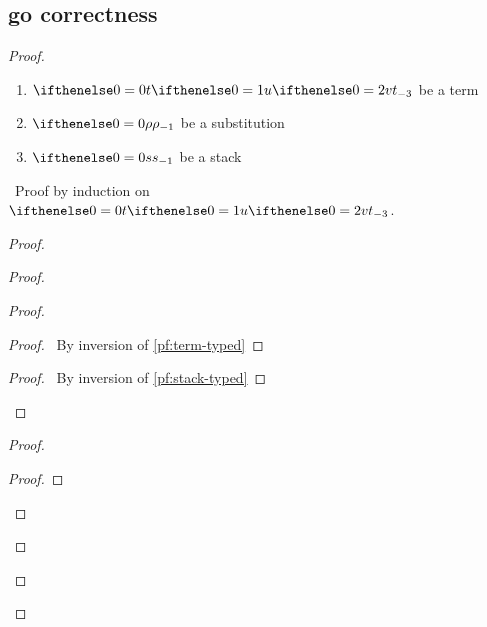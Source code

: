 \documentclass[a4paper]{article}
\begin{document}
\subsection{{\sf go} correctness}
\begin{proof}
  \pflet 
  {\begin{enumerate}
    \item $\aTerm$ be a term
    \item $\env$ be a substitution
    \item $\aStack$ be a stack
  \end{enumerate}}
  \prove{$\simplBeta[*] {\stackapp \aStack {\subs \aTerm \env}} {\betaNormal {\go {\scoped \aTerm \env} \aStack}}$}
  \pfsketch\ Proof by induction on $\aTerm$.
  \begin{proof}
    \begin{proof}
      \begin{proof}
        \begin{proof}
          \pf\ By inversion of \ref{pf:term-typed}
        \end{proof}
        \qedstep
        \begin{proof}
          \pf\ By inversion of \ref{pf:stack-typed}
        \end{proof}
      \end{proof}
      \begin{proof}
        \begin{proof}

\end{proof}
\end{proof}
\end{proof}
\end{proof}
\end{proof}
\end{document}
